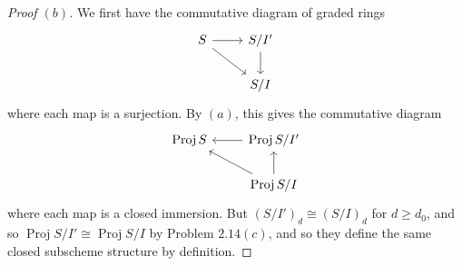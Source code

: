 \documentclass[12pt,letterpaper]{article}
\theoremstyle{definition}
\theoremstyle{remark}
\numberwithin{equation}{section}
\numberwithin{figure}{problem}
\DeclareMathOperator{\Proj}{Proj}
\begin{document}
\begin{proof}[Proof $(b)$]
  We first have the commutative diagram of graded rings
  \begin{equation*}
    \begin{tikzcd}
      S \rar\arrow{dr} & S/I'\dar\\
      & S/I
    \end{tikzcd}
  \end{equation*}
  where each map is a surjection. By $(a)$, this gives the commutative diagram
  \begin{equation*}
    \begin{tikzcd}
      \Proj S & \arrow{l} \Proj S/I'\\
      & \Proj S/I \arrow{ul}\uar
    \end{tikzcd}
  \end{equation*}
  where each map is a closed immersion. But $(S/I')_d \cong (S/I)_d$ for $d \ge d_0$, and so $\Proj S/I' \cong \Proj S/I$ by Problem $2.14(c)$, and so they define the same closed subscheme structure by definition.
\end{proof}
\end{document}
